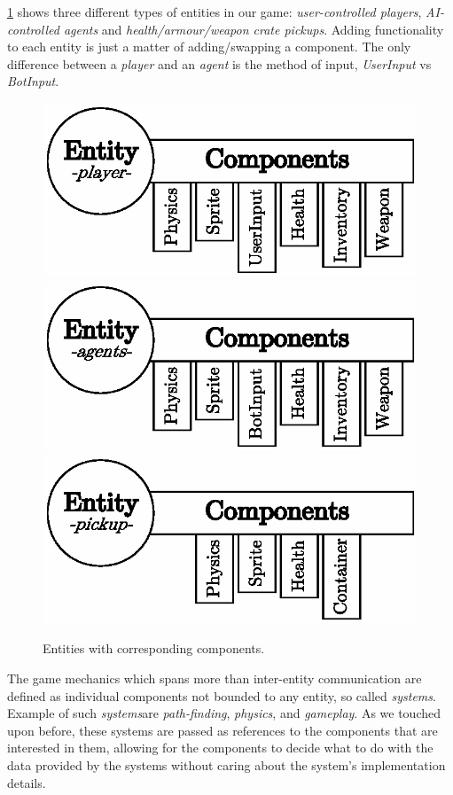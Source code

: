 \documentclass[a4paper, twocolumn]{article}
\begin{document}
        \cref{fig:entity_component_system} shows three different types of entities in our game: \emph{user-controlled players}, \emph{AI-controlled agents} and \emph{health/armour/weapon crate pickups}. Adding functionality to each entity is just a matter of adding/swapping a component. The only difference between a \emph{player} and an \emph{agent} is the method of input, \emph{UserInput} vs \emph{BotInput}.
        
        \begin{figure}[H]
            \centering
            \includegraphics[width=0.8\linewidth]{share/player_entity.eps}
            \includegraphics[width=0.8\linewidth]{share/agent_entity.eps}
            \includegraphics[width=0.8\linewidth]{share/pickup_entity.eps}
            \caption{Entities with corresponding components.}
            \label{fig:entity_component_system}
        \end{figure}

        The game mechanics which spans more than inter-entity communication are defined as individual components not bounded to any entity, so called \emph{systems}. Example of such \emph{systems}are \emph{path-finding}, \emph{physics}, and \emph{gameplay}. As we touched upon before, these systems are passed as references to the components that are interested in them, allowing for the components to decide what to do with the data provided by the systems without caring about the system's implementation details.
\end{document}
